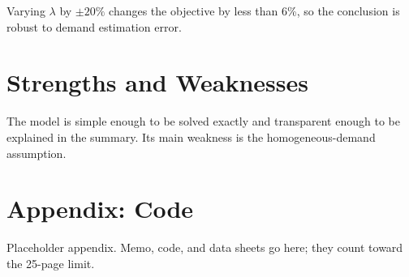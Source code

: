 \documentclass[12pt,letterpaper]{article}
\begin{document}
Varying $\lambda$ by $\pm20\%$ changes the objective by less than 6\%, so the
conclusion is robust to demand estimation error.

\section{Strengths and Weaknesses}

The model is simple enough to be solved exactly and transparent enough to be
explained in the summary. Its main weakness is the homogeneous-demand assumption.




\newpage
\appendix
\section{Appendix: Code}

Placeholder appendix. Memo, code, and data sheets go here; they count toward the
25-page limit.
\end{document}
